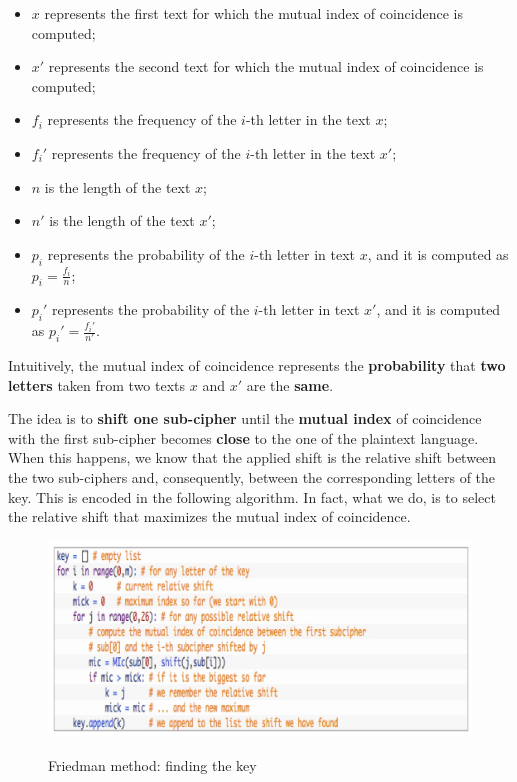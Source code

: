 \begin{itemize}
    \item $x$ represents the first text for which the mutual index of coincidence is computed;
    \item $x'$ represents the second text for which the mutual index of coincidence is computed;
    \item $f_i$ represents the frequency of the $i$-th letter in the text $x$;
    \item $f_i'$ represents the frequency of the $i$-th letter in the text $x'$;
    \item $n$ is the length of the text $x$;
    \item $n'$ is the length of the text $x'$;
    \item $p_i$ represents the probability of the $i$-th letter in text $x$, and it is computed as $p_i = \frac{f_i}{n}$;
    \item $p_i'$ represents the probability of the $i$-th letter in text $x'$, and it is computed as $p_i' = \frac{f_i'}{n'}$.
\end{itemize}

Intuitively, the mutual index of coincidence represents the \textbf{probability} that \textbf{two letters} taken from two texts $x$ and $x'$ are the \textbf{same}. 

The idea is to \textbf{shift one sub-cipher} until the \textbf{mutual index} of coincidence with the first sub-cipher becomes \textbf{close} to the one of the plaintext language. When this happens, we know that the applied shift is the relative shift between the two sub-ciphers and, consequently, between the corresponding letters of the key. This is encoded in the following algorithm. In fact, what we do, is to select the relative shift that maximizes the mutual index of coincidence.

\begin{figure}[h!]
        \centering
        \includegraphics[scale = 0.9]{img/poly4.jpg}
        \label{poly4}
        \caption{Friedman method: finding the key}
\end{figure}

